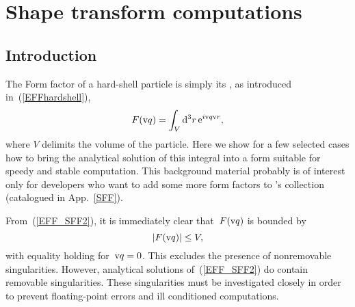 
\chapter{Shape transform computations}  \label{SFFcomp}


\section{Introduction}

The Form factor of a hard-shell particle is simply its ,
as introduced in~(\ref{EFFhardshell}),
\begin{equation}\label{EFF_SFF2}
  F(\text{v}{q})=\int_V {\rm d}^3r\, {\rm e}^{i\text{v}{q}\text{v}{r}},
\end{equation}
where $V$ delimits the volume of the particle.
Here we show for a few selected cases
how to bring the analytical solution of this integral into a form
 suitable for speedy and stable computation.
This background material probably is of interest only for
developers who want to add some more form factors to \BornAgain's collection
(catalogued in App.~\ref{SFF}).

%
From~(\ref{EFF_SFF2}), it is immediately clear that~$F(\text{v}{q})$ is bounded by
\begin{equation}
  |F(\text{v}{q})|\le V,
\end{equation}
with equality holding for~$\text{v}{q}=0$.
This excludes the presence of nonremovable singularities.
However, analytical solutions of~(\ref{EFF_SFF2}) do contain
removable singularities.
These singularities must be investigated closely
in order to prevent floating-point errors and ill conditioned computations.

